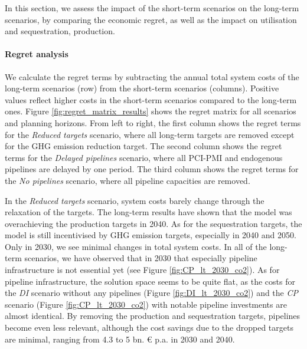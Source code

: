 \documentclass[preprint,12pt,sort&compress]{elsarticle}
\begin{document}
In this section, we assess the impact of the short-term scenarios on the long-term scenarios, by comparing the economic regret, as well as the impact on  utilisation and sequestration,  production. 

\paragraph{Regret analysis}
\label{sec:regret_analysis}
We calculate the regret terms by subtracting the annual total system costs of the long-term scenarios (row) from the short-term scenarios (columns). Positive values reflect higher costs in the short-term scenarios compared to the long-term ones. Figure \ref{fig:regret_matrix_results} shows the regret matrix for all scenarios and planning horizons. From left to right, the first column shows the regret terms for the \textit{Reduced targets} scenario, where all long-term targets are removed except for the GHG emission reduction target. The second column shows the regret terms for the \textit{Delayed pipelines} scenario, where all PCI-PMI and endogenous pipelines are delayed by one period. The third column shows the regret terms for the \textit{No pipelines} scenario, where all pipeline capacities are removed.

In the \textit{Reduced targets} scenario, system costs barely change through the relaxation of the targets. The long-term results have shown that the model was overachieving the  production targets in 2040. As for the  sequestration targets, the model is still incentivised by GHG emission targets, especially in 2040 and 2050. Only in 2030, we see minimal changes in total system costs. In all of the long-term scenarios, we have observed that in 2030 that especially  pipeline infrastructure is not essential yet (see Figure \ref{fig:CP_lt_2030_co2}). As for  pipeline infrastructure, the solution space seems to be quite flat, as the costs for the \textit{DI} scenario without any pipelines (Figure \ref{fig:DI_lt_2030_co2}) and the \textit{CP} scenario (Figure \ref{fig:CP_lt_2030_co2}) with notable pipeline investments are almost identical. By removing the  production and  sequestration targets, pipelines become even less relevant, although the cost savings due to the dropped targets are minimal, ranging from 4.3 to 5 bn. \euro{} p.a. in 2030 and 2040.
\end{document}
